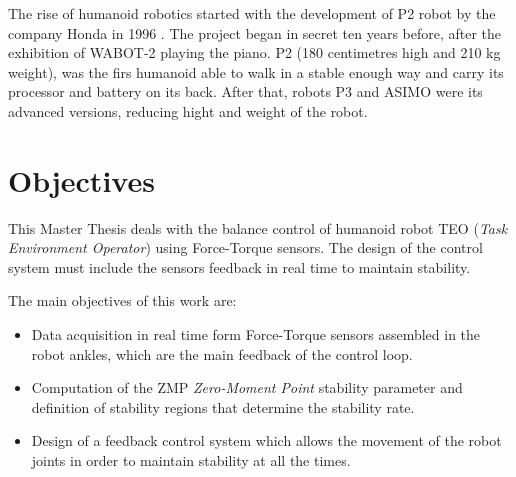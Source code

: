 The rise of humanoid robotics started with the development of P2 robot by the company Honda in 1996 \cite{Kaj2005}. The project began in secret ten years before, after the exhibition of WABOT-2 playing the piano. P2 (180 centimetres high and 210 kg weight), was the firs humanoid able to walk in a stable enough way and carry its processor and battery on its back. After that, robots P3 and ASIMO were its advanced versions, reducing hight and weight of the robot.


\section{Objectives}
This Master Thesis deals with the balance control of humanoid robot TEO (\textit{Task Environment Operator}) using Force-Torque sensors. The design of the control system must include the sensors feedback in real time to maintain stability.

The main objectives of this work are:
\begin{itemize}
\item Data acquisition in real time form Force-Torque sensors assembled in the robot ankles, which are the main feedback of the control loop.
\item Computation of the ZMP \textit{Zero-Moment Point} stability parameter and definition of stability regions that determine the stability rate.
\item Design of a feedback control system which allows the movement of the robot joints in order to maintain stability at all the times.
\end{itemize}


